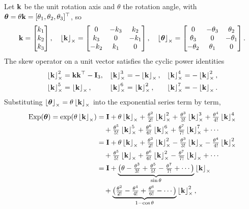 Let $\vect{k}$ be the unit rotation axis and $\theta$ the rotation angle, with $\vect{\theta} = \theta\vect{k} = [\theta_1,\theta_2,\theta_3]\trans$, so
\begin{align}
\vect{k} = \begin{bmatrix} k_1 \\ k_2 \\ k_3 \end{bmatrix},\quad
\skewsym{\vect{k}} = \begin{bmatrix} 0 & -k_3 & k_2 \\ k_3 & 0 & -k_1 \\ -k_2 & k_1 & 0 \end{bmatrix},\quad
\skewsym{\vect{\theta}} = \begin{bmatrix} 0 & -\theta_3 & \theta_2 \\ \theta_3 & 0 & -\theta_1 \\ -\theta_2 & \theta_1 & 0 \end{bmatrix}.
\end{align}
The skew operator on a unit vector satisfies the cyclic power identities
\begin{align}
\skewsym{\vect{k}}^{2} &= \vect{k}\vect{k}\trans - \vect{I}_3, &
\skewsym{\vect{k}}^{3} &= -\skewsym{\vect{k}}, &
\skewsym{\vect{k}}^{4} &= -\skewsym{\vect{k}}^{2}, \\
\skewsym{\vect{k}}^{5} &= \skewsym{\vect{k}}, &
\skewsym{\vect{k}}^{6} &= \skewsym{\vect{k}}^{2}, &
\skewsym{\vect{k}}^{7} &= -\skewsym{\vect{k}}.
\end{align}
Substituting $\skewsym{\vect{\theta}} = \theta\skewsym{\vect{k}}$ into the exponential series term by term,
\begin{align}
\Exp(\vect{\theta}) = \exp(\theta\skewsym{\vect{k}})
&= \vect{I} + \theta\skewsym{\vect{k}} + \tfrac{\theta^2}{2!}\skewsym{\vect{k}}^2 + \tfrac{\theta^3}{3!}\skewsym{\vect{k}}^3 + \tfrac{\theta^4}{4!}\skewsym{\vect{k}}^4 \notag\\
&\quad + \tfrac{\theta^5}{5!}\skewsym{\vect{k}}^5 + \tfrac{\theta^6}{6!}\skewsym{\vect{k}}^6 + \tfrac{\theta^7}{7!}\skewsym{\vect{k}}^7 + \cdots \notag\\
&= \vect{I} + \theta\skewsym{\vect{k}} + \tfrac{\theta^2}{2!}\skewsym{\vect{k}}^2 - \tfrac{\theta^3}{3!}\skewsym{\vect{k}} - \tfrac{\theta^4}{4!}\skewsym{\vect{k}}^2 \notag\\
&\quad + \tfrac{\theta^5}{5!}\skewsym{\vect{k}} + \tfrac{\theta^6}{6!}\skewsym{\vect{k}}^2 - \tfrac{\theta^7}{7!}\skewsym{\vect{k}} + \cdots \notag\\
&= \vect{I} + \underbrace{\big(\theta - \tfrac{\theta^3}{3!} + \tfrac{\theta^5}{5!} - \tfrac{\theta^7}{7!} + \cdots\big)}_{\sin\theta}\skewsym{\vect{k}} \notag\\
&\quad + \underbrace{\big(\tfrac{\theta^2}{2!} - \tfrac{\theta^4}{4!} + \tfrac{\theta^6}{6!} - \cdots\big)}_{1-\cos\theta}\skewsym{\vect{k}}^2,
\end{align}
